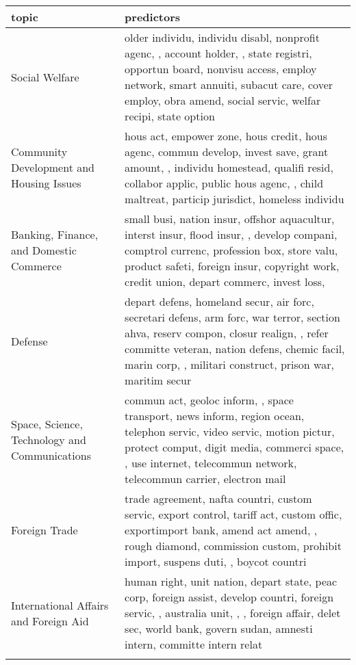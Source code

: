 \begingroup\tiny
\begin{longtable}{p{}p{}}
  \hline
topic & predictors \\ 
   \hline
Social Welfare & older individu, individu disabl, nonprofit agenc, {\color{red}{care account}}, account holder, {\color{red}{disabl beneficiari}}, state registri, opportun board, nonvisu access, employ network, smart annuiti, subacut care, cover employ, obra amend, social servic,  welfar recipi, state option \\ 
   \hline
Community Development and Housing Issues & hous act, empower zone, hous credit, hous agenc, commun develop, invest save, grant amount, {\color{red}{mortgag insur}}, individu homestead, qualifi resid, collabor applic, public hous agenc, {\color{red}{foreclosur commission}}, child maltreat, particip jurisdict, homeless individu \\ 
   \hline
Banking, Finance, and Domestic Commerce & small busi, nation insur, offshor aquacultur, interst insur, flood insur, {\color{red}{financi compani}}, develop compani, comptrol currenc, profession box, store valu, product safeti, foreign insur, copyright work, credit union, depart commerc, invest loss, {\color{red}{antitrust law}} \\ 
   \hline
Defense & depart defens, homeland secur, air forc, secretari defens, arm forc, war terror, section ahva, reserv compon, closur realign, {\color{red}{ammonium nitrat}}, refer committe veteran, nation defens, chemic facil, marin corp, {\color{red}{nation intellig}}, militari construct, prison war, maritim secur \\ 
   \hline
Space, Science, Technology and Communications & commun act, geoloc inform, {\color{red}{broadband servic}}, space transport, news inform, region ocean, telephon servic, video servic, motion pictur, protect comput, digit media, commerci space, {\color{red}{digit televis}}, use internet, telecommun network, telecommun carrier, electron mail \\ 
   \hline
Foreign Trade & trade agreement, nafta countri, custom servic, export control, tariff act, custom offic, exportimport bank, amend act amend, {\color{red}{trade deficit}}, rough diamond, commission custom, prohibit import, suspens duti, {\color{red}{foreign person}}, boycot countri \\ 
   \hline
International Affairs and Foreign Aid & human right, unit nation, depart state, peac corp, foreign assist, develop countri, foreign servic, {\color{red}{secretari state}}, australia unit, {\color{red}{obstetr fistula}}, {\color{red}{panama canal}}, foreign affair, delet sec, world bank, govern sudan, amnesti intern, committe intern relat \\ 

\hline
\label{tab:top20_major}
\end{longtable}
\endgroup
